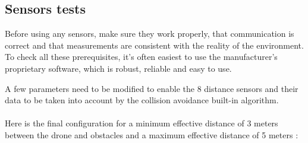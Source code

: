 \subsection{Sensors tests}
Before using any sensors, make sure they work properly, that communication is correct and that measurements are consistent with the reality of the environment.
To check all these prerequisites, it's often easiest to use the manufacturer's proprietary software, which is robust, reliable and easy to use.

A few parameters need to be modified to enable the 8 distance sensors and their data to be taken into account by the collision avoidance built-in algorithm.
\\ \\
Here is the final configuration for a minimum effective distance of 3 meters between the drone and obstacles and a maximum effective distance of 5 meters :

